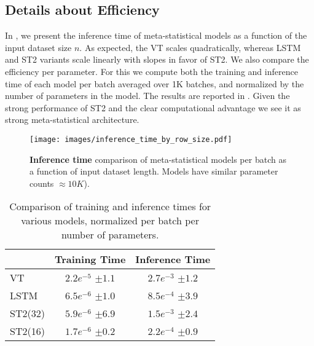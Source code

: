 \subsection{Details about Efficiency}
\label{app:eff}
In , we present the inference time of meta-statistical models as a function of the input dataset size \( n \). As expected, the VT scales quadratically, whereas LSTM and ST2 variants scale linearly with slopes in favor of ST2.
We also compare the efficiency per parameter. For this we compute both the training and inference time of each model per batch averaged over 1K batches, and normalized by the number of parameters in the model. The results are reported in . Given the strong performance of ST2 and the clear computational advantage we see it as strong meta-statistical architecture.

\begin{figure}
    \centering
    \texttt{[image: images/inference\_time\_by\_row\_size.pdf]}
    \caption{\textbf{Inference time} comparison of meta-statistical models per batch as a function of input dataset length. Models have similar parameter counts $\approx 10K$).}
    \label{fig:inference_time}
\end{figure}

\begin{table}[t]
\centering
 \begin{tabular}{@{}l|c|c@{}}
    \toprule
     & Training Time & Inference Time \\
    \midrule
    \midrule
    VT & $2.2e^{-5} $ \scriptsize{$\pm 1.1$} & $2.7e^{-3}$ \scriptsize{$\pm 1.2$} \\
    LSTM & $6.5e^{-6} $ \scriptsize{$\pm 1.0$} & $8.5e^{-4}$ \scriptsize{$\pm 3.9$} \\
    ST2(32) & $5.9e^{-6} $ \scriptsize{$\pm 6.9$} & $1.5e^{-3}$ \scriptsize{$\pm 2.4$} \\
    ST2(16) & $1.7e^{-6} $ \scriptsize{$\pm 0.2$} & $2.2e^{-4}$ \scriptsize{$\pm 0.9$} \\
    \bottomrule
\end{tabular}
\caption{Comparison of training and inference times for various models, normalized per batch per number of parameters.}
\label{tab:times}
\end{table}

        
        
           
